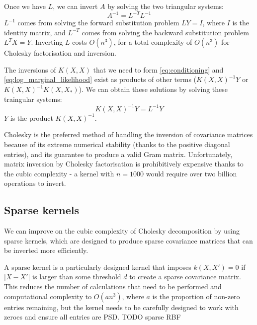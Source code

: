 Once we have $L$, we can invert $A$ by solving the two triangular systems:
\begin{equation*}
    A^{-1} = L^{-T} L^{-1}
\end{equation*}
$L^{-1}$ comes from solving the forward substitution problem $LY = I$, where $I$ is the identity matrix, and $L^{-T}$ comes from solving the backward substitution problem $L^TX = Y$. Inverting $L$ costs $O(n^3)$, for a total complexity of $O(n^3)$ for Cholesky factorisation and inversion. 

The inversions of $K(X, X)$ that we need to form \ref{eq:conditioning} and \ref{eq:log_marginal_likelihood} exist as products of other terms ($K(X,X)^{-1} Y$ or $K(X,X)^{-1} K(X, X_*)$). We can obtain these solutions by solving these traingular systems:
\begin{equation*}
    K(X, X)^{-1} Y = L^{-1} Y
\end{equation*}
$Y$ is the product $K(X, X)^{-1}$. 

Cholesky is the preferred method of handling the inversion of covariance matrices because of its extreme numerical stability (thanks to the positive diagonal entries), and its guarantee to produce a valid Gram matrix. Unfortunately, matrix inversion by Cholesky factorisation is prohibitively expensive thanks to the cubic complexity - a kernel with $n = 1000$ would require over two billion operations to invert. 



\subsection{Sparse kernels}
We can improve on the cubic complexity of Cholesky decomposition by using sparse kernels, which are designed to produce sparse covariance matrices that can be inverted more efficiently.

A sparse kernel \cite{big-data} is a particularly designed kernel that imposes $k(X,X') = 0$ if $|X - X'|$ is larger than some threshold $d$ to create a sparse covariance matrix. This reduces the number of calculations that need to be performed and computational complexity to $O(an^3)$, where $a$ is the proportion of non-zero entries remaining, but the kernel needs to be carefully designed to work with zeroes and ensure all entries are PSD. TODO sparse RBF


